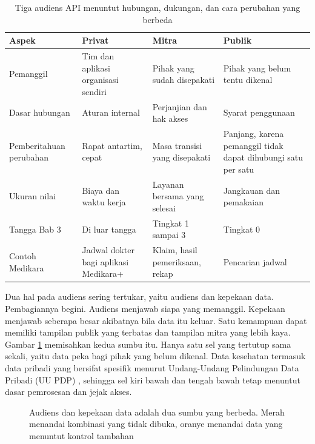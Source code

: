 \begin{table}[!htb]
  \centering
  \caption{Tiga audiens API menuntut hubungan, dukungan, dan cara perubahan yang berbeda}
  \label{tab:ch04-audiens}
  \small
  \begin{tabularx}{\textwidth}{K{2.45cm}JJJ}
    \hline
    \textbf{Aspek} & \textbf{Privat} & \textbf{Mitra} & \textbf{Publik} \\ \hline
    Pemanggil & Tim dan aplikasi organisasi sendiri & Pihak yang sudah disepakati & Pihak yang belum tentu dikenal \\ \hline
    Dasar hubungan & Aturan internal & Perjanjian dan hak akses & Syarat penggunaan \\ \hline
    Pemberitahuan perubahan & Rapat antartim, cepat & Masa transisi yang disepakati & Panjang, karena pemanggil tidak dapat dihubungi satu per satu \\ \hline
    Ukuran nilai & Biaya dan waktu kerja & Layanan bersama yang selesai & Jangkauan dan pemakaian \\ \hline
    Tangga Bab 3 & Di luar tangga & Tingkat 1 sampai 3 & Tingkat 0 \\ \hline
    Contoh Medikara & Jadwal dokter bagi aplikasi Medikara+ & Klaim, hasil pemeriksaan, rekap & Pencarian jadwal \\ \hline
  \end{tabularx}
\end{table}

Dua hal pada audiens sering tertukar, yaitu audiens dan kepekaan data. Pembagiannya begini. Audiens
menjawab siapa yang memanggil. Kepekaan menjawab seberapa besar akibatnya bila data itu keluar. Satu
kemampuan dapat memiliki tampilan publik yang terbatas dan tampilan mitra yang lebih kaya. Gambar
\ref{fig:ch04-audiens-sensitivitas} memisahkan kedua sumbu itu. Hanya satu sel yang tertutup sama
sekali, yaitu data peka bagi pihak yang belum dikenal. Data kesehatan termasuk data pribadi yang
bersifat spesifik menurut Undang-Undang Pelindungan Data Pribadi (UU PDP) \cite{uu27-2022-pdp}, sehingga
sel kiri bawah dan tengah bawah tetap menuntut dasar pemrosesan dan jejak akses.

\begin{figure}[!htb]
  \centering
  
  \caption{Audiens dan kepekaan data adalah dua sumbu yang berbeda. Merah menandai kombinasi yang tidak
           dibuka, oranye menandai data yang menuntut kontrol tambahan}
  \label{fig:ch04-audiens-sensitivitas}
\end{figure}

